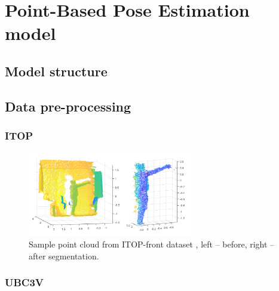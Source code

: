 \section{Point-Based Pose Estimation model}


\subsection{Model structure}



\subsection{Data pre-processing}

\subsubsection{ITOP}


\begin{figure}[H]
\begin{center}
  \includegraphics[height=140px]{images/implementation/itop_seg.png}
  \caption[Sample point cloud from ITOP-front dataset \cite{haque2016viewpoint}.]{ Sample point cloud from ITOP-front dataset \cite{haque2016viewpoint}, left – before, right – after segmentation.}
  \label{fig:itop_seg}
\end{center}
\end{figure}

\subsubsection{UBC3V}

